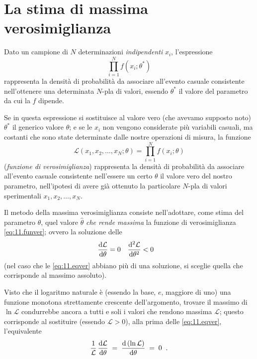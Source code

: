 \section{La stima di massima verosimiglianza}%
%
\label{ch:11.maxver}
Dato un campione di $N$ determinazioni \emph{indipendenti}
$x_i$, l'espressione
\begin{equation*}
  \prod_{i=1}^N f(x_i; \theta^*)
\end{equation*}
rappresenta la densit\`a di probabilit\`a da associare
all'evento casuale consistente nell'ottenere una determinata
$N$-pla di valori, essendo $\theta^*$ il valore del
parametro da cui la $f$ dipende.

%
Se in questa espressione si sostituisce al valore vero (che
avevamo supposto noto) $\theta^*$ il generico valore
$\theta$; e se le $x_i$ non vengono considerate pi\`u
variabili casuali, ma costanti che sono state determinate
dalle nostre operazioni di misura, la funzione
\begin{equation} \label{eq:11.funver}
  \mathcal{L} ( x_1, x_2,\ldots, x_N; \theta ) =
    \prod_{i=1}^N f(x_i; \theta)
\end{equation}
(\emph{funzione di verosimiglianza}) rappresenta la
densit\`a di probabilit\`a da associare all'evento casuale
consistente nell'essere un certo $\theta$ il valore vero del
nostro parametro, nell'ipotesi di avere gi\`a ottenuto la
particolare $N$-pla di valori sperimentali $x_1, x_2,\ldots,
x_N$.%

Il metodo della massima verosimiglianza consiste
nell'adottare, come stima del parametro $\theta$, quel
valore $\widehat \theta$ \emph{che rende massima} la
funzione di verosimiglianza \eqref{eq:11.funver}; ovvero la
soluzione delle
\begin{align} \label{eq:11.eqver}
  \frac{\mathrm{d} \mathcal{L}}{\mathrm{d} \theta} &= 0 &
  \frac{\mathrm{d}^2 \mathcal{L}}{\mathrm{d} \theta^2} &< 0
\end{align}
(nel caso che le \eqref{eq:11.eqver} abbiano pi\`u di una
soluzione, si sceglie quella che corrisponde al massimo
assoluto).

Visto che il logaritmo naturale \`e (essendo la base, $e$,
maggiore di uno) una funzione monotona strettamente
crescente dell'argomento, trovare il massimo di $\ln
\mathcal{L}$ condurrebbe ancora a tutti e soli i valori che
rendono massima $\mathcal{L}$; questo corrisponde al
sostituire (essendo $\mathcal{L} > 0$), alla prima delle
\eqref{eq:11.eqver}, l'equivalente
\begin{equation*}
  \frac{1}{\mathcal{L}} \, \frac{\mathrm{d} \mathcal{L}}{\mathrm{d}
    \theta} \; = \; \frac{\mathrm{d} \, ( \ln \mathcal{L} )}{\mathrm{d}
    \theta} \; = \; 0 \;\; .
\end{equation*}

